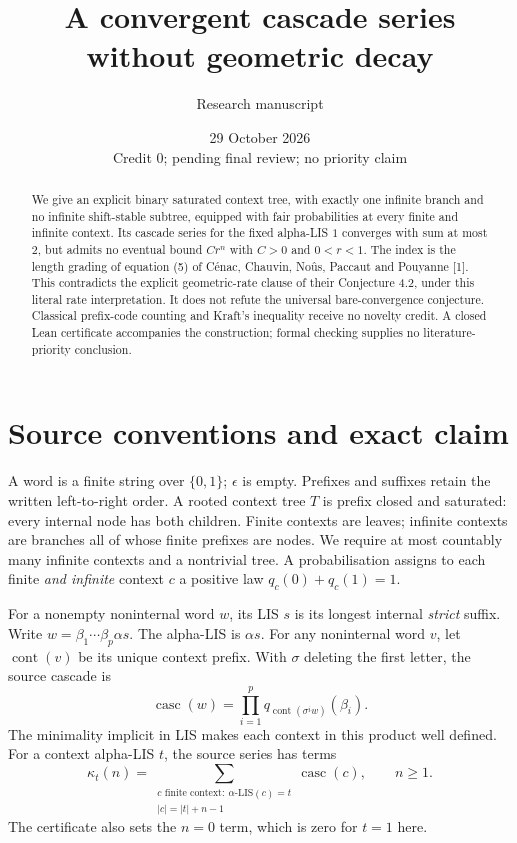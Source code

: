 \documentclass[11pt]{article}
\title{A convergent cascade series without geometric decay}
\author{Research manuscript}
\date{29 October 2026\\Credit 0; pending final review; no priority claim}
\newcommand{\kap}{\kappa}
\begin{document}
\maketitle
\begin{abstract}
We give an explicit binary saturated context tree, with exactly one infinite
branch and no infinite shift-stable subtree, equipped with fair probabilities
at every finite and infinite context. Its cascade series for the fixed
alpha-LIS $1$ converges with sum at most $2$, but admits no eventual bound
$Cr^n$ with $C>0$ and $0<r<1$. The index is the length grading of equation (5)
of C\'enac, Chauvin, No\^us, Paccaut and Pouyanne [1]. This contradicts the
explicit geometric-rate clause of their Conjecture 4.2, under this literal
rate interpretation. It does not refute the universal bare-convergence
conjecture. Classical prefix-code counting and Kraft's inequality receive no
novelty credit. A closed Lean certificate accompanies the construction;
formal checking supplies no literature-priority conclusion.
\end{abstract}
\section{Source conventions and exact claim}
A word is a finite string over $\{0,1\}$; $\epsilon$ is empty. Prefixes and
suffixes retain the written left-to-right order. A rooted context tree $T$
is prefix closed and saturated: every internal node has both children.
Finite contexts are leaves; infinite contexts are branches all of whose
finite prefixes are nodes. We require at most countably many infinite
contexts and a nontrivial tree. A probabilisation assigns to each finite
\emph{and infinite} context $c$ a positive law $q_c(0)+q_c(1)=1$.

For a nonempty noninternal word $w$, its LIS $s$ is its longest internal
\emph{strict} suffix. Write $w=\beta_1\cdots\beta_p\alpha s$.
The alpha-LIS is $\alpha s$. For any noninternal word $v$, let
$\operatorname{cont}(v)$ be its unique context prefix. With $\sigma$ deleting
the first letter, the source cascade is
\[
 \operatorname{casc}(w)=\prod_{i=1}^p
 q_{\operatorname{cont}(\sigma^i w)}(\beta_i).
\]
The minimality implicit in LIS makes each context in this product well defined.
For a context alpha-LIS $t$, the source series has terms
\[
 \kap_t(n)=\sum_{\substack{c\text{ finite context}:\ \alpha\text{-LIS}(c)=t\\
 |c|=|t|+n-1}}\operatorname{casc}(c),\qquad n\geq1.
\]
The certificate also sets the $n=0$ term, which is zero for $t=1$ here.
\newpage
\end{document}
